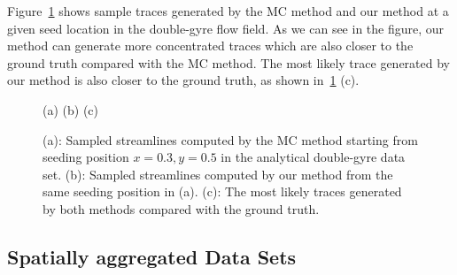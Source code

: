 Figure~\ref{case_1} shows sample traces generated by the MC method and our method at a given seed location in the double-gyre flow field. As we can see in the figure, our method can generate more concentrated traces which are also closer to the ground truth compared with the MC method. The most likely trace generated by our method is also closer to the ground truth, as shown in~\ref{case_1} (c).

\begin{figure}[!htb]
   \centering
  \small
  (a)  \hfill
  (b)  \hfill
  (c) 
  \caption{(a): Sampled streamlines computed by the MC method starting from seeding position $x=0.3, y=0.5$ in the analytical double-gyre data set. (b): Sampled streamlines computed by our method from the same seeding position in (a). (c): The most likely traces generated by both methods compared with the ground truth.}
  \label{case_1}
\end{figure}

\subsection{Spatially aggregated Data Sets}

